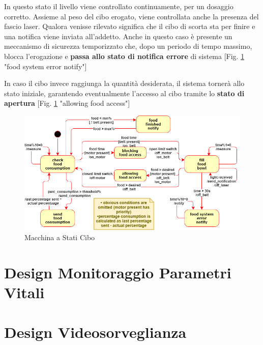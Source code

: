     In questo stato il livello viene controllato continuamente, per un dosaggio corretto. Assieme al peso del cibo erogato, viene controllata anche la presenza del fascio laser. Qualora venisse rilevato significa che il cibo di scorta sta per finire e una notifica viene inviata all'addetto.
    Anche in questo caso è presente un meccanismo di sicurezza temporizzato che, dopo un periodo di tempo massimo, blocca l'erogazione e \textbf{passa allo stato di notifica errore} di sistema [Fig. \ref{fig:statediagramFood} "food system error notify"]
    
    In caso il cibo invece raggiunga la quantità desiderata, il sistema tornerà allo stato iniziale, garantendo eventualmente l'accesso al cibo tramite lo \textbf{stato di apertura} [Fig. \ref{fig:statediagramFood} "allowing food access"]    
    
    \begin{figure}[H]
        \caption{Macchina a Stati Cibo}
        \label{fig:statediagramFood}
        \centering
        \includegraphics[width=1\textwidth]{DrawIo/stateDiagramFood.png}
    \end{figure}
    
    
\section{Design Monitoraggio Parametri Vitali}

\section{Design Videosorveglianza}

